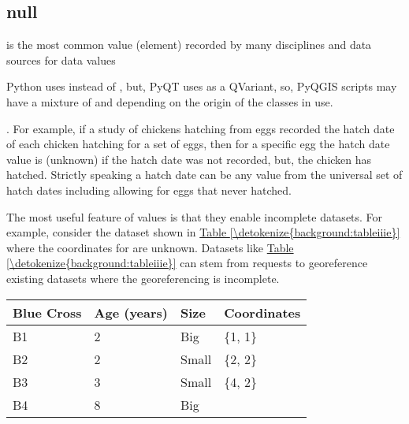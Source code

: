 \documentclass[a4paper,11pt,english]{sphinxmanual}
\begin{document}
\subsection{null}
\label{\detokenize{background:null}}
 is the most common value (element) recorded by many disciplines and data sources for  data values %
\begin{footnote}[7]\sphinxAtStartFootnote
Python uses  instead of , but, PyQT uses  as a QVariant, so, PyQGIS scripts may have a mixture of  and  depending on the origin of the classes in use.
%
\end{footnote}.  For example, if a study of chickens hatching from eggs recorded the hatch date of each chicken hatching for a set of eggs, then for a specific egg the hatch date value is  (unknown) if the hatch date was not recorded, but, the chicken has hatched.  Strictly speaking a  hatch date can be any value from the universal set of hatch dates including  allowing for eggs that never hatched.

The most useful feature of  values is that they enable incomplete datasets.  For example, consider the  dataset shown in \hyperref[\detokenize{background:tableiiie}]{Table \ref{\detokenize{background:tableiiie}}} where the coordinates for  are unknown. Datasets like \hyperref[\detokenize{background:tableiiie}]{Table \ref{\detokenize{background:tableiiie}}} can stem from requests to georeference existing datasets where the georeferencing is incomplete.


\begin{savenotes}\sphinxattablestart
\centering
{}
\sphinxthecaptionisattop
{}\label{\detokenize{background:id37}}\label{\detokenize{background:tableiiie}}
\sphinxaftertopcaption
\begin{tabulary}{\linewidth}[t]{|T|T|T|T|}
\hline
\sphinxstyletheadfamily 
Blue Cross
&\sphinxstyletheadfamily 
Age (years)
&\sphinxstyletheadfamily 
Size
&\sphinxstyletheadfamily 
Coordinates
\\
\hline
B1
&
2
&
Big
&
\{1, 1\}
\\
\hline
B2
&
2
&
Small
&
\{2, 2\}
\\
\hline
B3
&
3
&
Small
&
\{4, 2\}
\\
\hline
B4
&
8
&
Big
&
\\
\hline
\end{tabulary}
\par
\sphinxattableend\end{savenotes}
\end{document}
